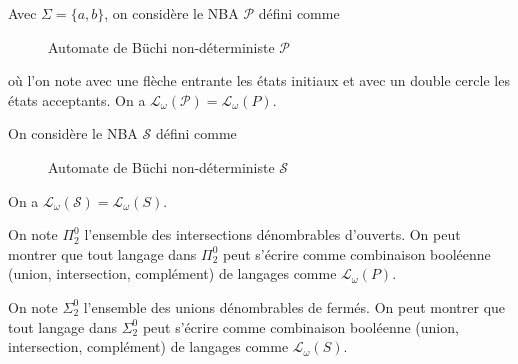 \documentclass[./main]{subfiles}
\begin{document}
  \begin{exm}
    Avec $\Sigma = \{a, b\}$, on considère le NBA $\mathcal{P}$ défini comme
    \begin{figure}[H]
      \centering
      \caption{Automate de Büchi non-déterministe $\mathcal{P}$}
    \end{figure}
    où l'on note avec une flèche entrante les états initiaux et avec un double cercle les états acceptants.
    On a $\mathcal{L}_\omega(\mathcal{P}) = \mathcal{L}_\omega(P)$.
  \end{exm}

  \begin{exm}
    On considère le NBA $\mathcal{S}$ défini comme 
    \begin{figure}[H]
      \centering
      \caption{Automate de Büchi non-déterministe $\mathcal{S}$}
    \end{figure}
    On a $\mathcal{L}_\omega(\mathcal{S}) = \mathcal{L}_\omega(S)$.
  \end{exm}

  \begin{rmk}
    On note $\Pi^0_2$ l'ensemble des intersections dénombrables d'ouverts.
    On peut montrer que tout langage dans $\Pi^0_2$ peut s'écrire comme combinaison booléenne (union, intersection, complément) de langages comme $\mathcal{L}_\omega(P)$.

    On note $\Sigma^0_2$ l'ensemble des unions dénombrables de fermés.
    On peut montrer que tout langage dans $\Sigma^0_2$ peut s'écrire comme combinaison booléenne (union, intersection, complément) de langages comme $\mathcal{L}_\omega(S)$.
  \end{rmk}
\end{document}
